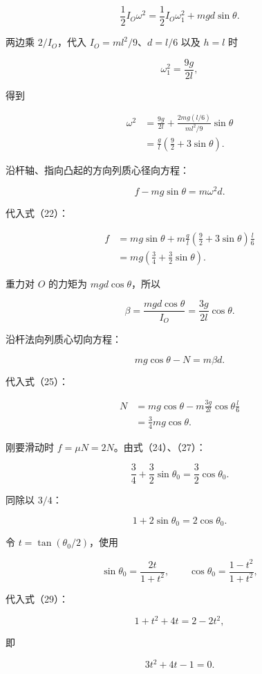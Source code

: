 \documentclass[12pt,a4paper,UTF8]{ctexart}
\begin{document}
\[
\frac12I_O\omega^2
=\frac12I_O\omega_1^2+mgd\sin\theta.
\tag{20}
\]

两边乘 \(2/I_O\)，代入 \(I_O=ml^2/9\)、\(d=l/6\) 以及 \(h=l\) 时

\[
\omega_1^2=\frac{9g}{2l},
\tag{21}
\]

得到

\[
\begin{aligned}
\omega^2
&=\frac{9g}{2l}
+\frac{2mg(l/6)}{ml^2/9}\sin\theta\\
&=\frac gl\left(\frac92+3\sin\theta\right).
\end{aligned}
\tag{22}
\]

沿杆轴、指向凸起的方向列质心径向方程：

\[
f-mg\sin\theta=m\omega^2d.
\tag{23}
\]

代入式（22）：

\[
\begin{aligned}
f
&=mg\sin\theta
+m\frac gl\left(\frac92+3\sin\theta\right)\frac l6\\
&=mg\left(\frac34+\frac32\sin\theta\right).
\end{aligned}
\tag{24}
\]

重力对 \(O\) 的力矩为 \(mgd\cos\theta\)，所以

\[
\beta=\frac{mgd\cos\theta}{I_O}
=\frac{3g}{2l}\cos\theta.
\tag{25}
\]

沿杆法向列质心切向方程：

\[
mg\cos\theta-N=m\beta d.
\tag{26}
\]

代入式（25）：

\[
\begin{aligned}
N
&=mg\cos\theta
-m\frac{3g}{2l}\cos\theta\frac l6\\
&=\frac34mg\cos\theta.
\end{aligned}
\tag{27}
\]

刚要滑动时 \(f=\mu N=2N\)。由式（24）、（27）：

\[
\frac34+\frac32\sin\theta_0
=\frac32\cos\theta_0.
\tag{28}
\]

同除以 \(3/4\)：

\[
1+2\sin\theta_0=2\cos\theta_0.
\tag{29}
\]

令 \(t=\tan(\theta_0/2)\)，使用

\[
\sin\theta_0=\frac{2t}{1+t^2},
\qquad
\cos\theta_0=\frac{1-t^2}{1+t^2},
\tag{30}
\]

代入式（29）：

\[
1+t^2+4t=2-2t^2,
\tag{31}
\]

即

\[
3t^2+4t-1=0.
\tag{32}
\]
\end{document}
